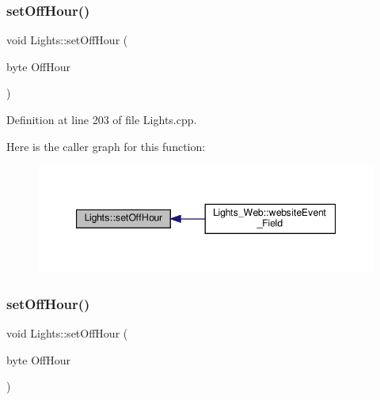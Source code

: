 \mbox{\label{class_lights_a744c6694c60c9f003bf1f88273437d89}} 
\subsubsection{\texorpdfstring{set\+Off\+Hour()}{setOffHour()}\hspace{0.1cm}{\footnotesize\ttfamily [1/2]}}
{\footnotesize\ttfamily void Lights\+::set\+Off\+Hour (\begin{DoxyParamCaption}\item[{byte}]{Off\+Hour }\end{DoxyParamCaption})\hspace{0.3cm}{\ttfamily [protected]}}



Definition at line 203 of file Lights.\+cpp.

Here is the caller graph for this function\+:
\nopagebreak
\begin{figure}[H]
\begin{center}
\leavevmode
\includegraphics[width=347pt]{class_lights_a744c6694c60c9f003bf1f88273437d89_icgraph}
\end{center}
\end{figure}
\mbox{\label{class_lights_a744c6694c60c9f003bf1f88273437d89}} 
\subsubsection{\texorpdfstring{set\+Off\+Hour()}{setOffHour()}\hspace{0.1cm}{\footnotesize\ttfamily [2/2]}}
{\footnotesize\ttfamily void Lights\+::set\+Off\+Hour (\begin{DoxyParamCaption}\item[{byte}]{Off\+Hour }\end{DoxyParamCaption})\hspace{0.3cm}{\ttfamily [protected]}}

